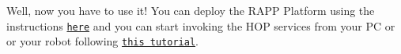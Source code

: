 Well, now you have to use it! You can deploy the R\-A\-P\-P Platform using the instructions \href{https://github.com/rapp-project/rapp-platform/wiki/How-do-I-launch-the-RAPP-Platform%3F}{\tt here} and you can start invoking the H\-O\-P services from your P\-C or or your robot following \href{https://github.com/rapp-project/rapp-platform/wiki/How-to-call-the-HOP-service-I-created%3F}{\tt this tutorial}. 